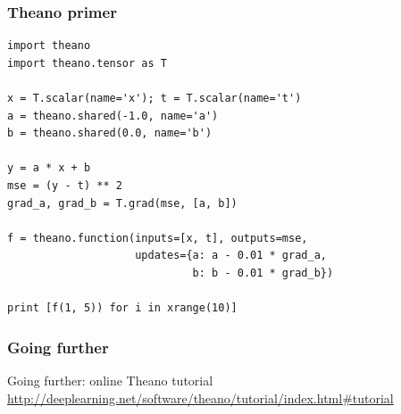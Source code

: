 \documentclass[mathserif, xcolor=dvipsnames]{beamer}
\begin{document}
\begin{frame}[fragile]
    \frametitle{Theano primer}
    \begin{examples}
\begin{lstlisting}[caption=Linear regression]
import theano
import theano.tensor as T

x = T.scalar(name='x'); t = T.scalar(name='t')
a = theano.shared(-1.0, name='a')
b = theano.shared(0.0, name='b')

y = a * x + b
mse = (y - t) ** 2
grad_a, grad_b = T.grad(mse, [a, b])

f = theano.function(inputs=[x, t], outputs=mse,
                    updates={a: a - 0.01 * grad_a,
                             b: b - 0.01 * grad_b})

print [f(1, 5)) for i in xrange(10)]
\end{lstlisting}
    \end{examples}
\end{frame}

\begin{frame}
    \frametitle{Going further}
    \begin{alertblock}{Going further: online Theano tutorial}
    \url{http://deeplearning.net/software/theano/tutorial/index.html\#tutorial}
    \end{alertblock}
\end{frame}
\end{document}
